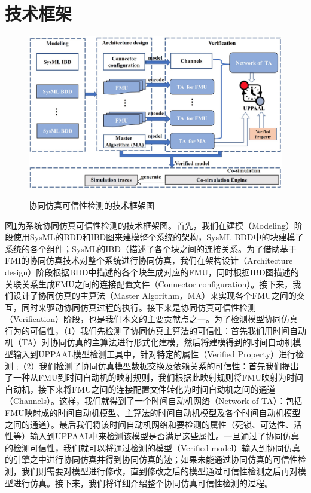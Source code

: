 \section{技术框架}
\begin{figure}[htbp]
	\centering
	{\includegraphics[width=6.0in]{fig/3/framework-3.png}}
	\caption{协同仿真可信性检测的技术框架图}\label{fra-3}
\end{figure}
图\ref{fra-3}为系统协同仿真可信性检测的技术框架图。首先，我们在建模（Modeling）阶段使用SysML的BDD和IBD图来建模整个系统的架构，SysML BDD中的块建模了系统的各个组件；SysML的IBD（描述了各个块之间的连接关系。为了借助基于FMI的协同仿真技术对整个系统进行协同仿真，我们在架构设计（Architecture design）阶段根据BDD中描述的各个块生成对应的FMU，同时根据IBD图描述的关联关系生成FMU之间的连接配置文件（Connector configuration）。接下来，我们设计了协同仿真的主算法（Master Algorithm，MA）来实现各个FMU之间的交互，同时来驱动协同仿真过程的执行。接下来是协同仿真可信性检测（Verification）阶段，也是我们本文的主要贡献点之一。为了检测模型协同仿真行为的可信性，（1）我们先检测了协同仿真主算法的可信性：首先我们用时间自动机（TA）对协同仿真的主算法进行形式化建模，然后将建模得到的时间自动机模型输入到UPPAAL模型检测工具中，针对特定的属性（Verified Property）进行检测 ;（2）我们检测了协同仿真模型数据交换及依赖关系的可信性：首先我们提出了一种从FMU到时间自动机的映射规则，我们根据此映射规则将FMU映射为时间自动机，接下来将FMU之间的连接配置文件转化为时间自动机之间的通道（Channels）。这样，我们就得到了一个时间自动机网络（Network of TA）：包括FMU映射成的时间自动机模型、主算法的时间自动机模型及各个时间自动机模型之间的通道）。最后我们将该时间自动机网络和要检测的属性（死锁、可达性、活性等）输入到UPPAAL中来检测该模型是否满足这些属性。一旦通过了协同仿真的检测可信性，我们就可以将通过检测的模型（Verified model）输入到协同仿真的引擎之中进行协同仿真并得到协同仿真的迹；如果未能通过协同仿真的可信性检测，我们则需要对模型进行修改，直到修改之后的模型通过可信性检测之后再对模型进行仿真。接下来，我们将详细介绍整个协同仿真可信性检测的过程。
